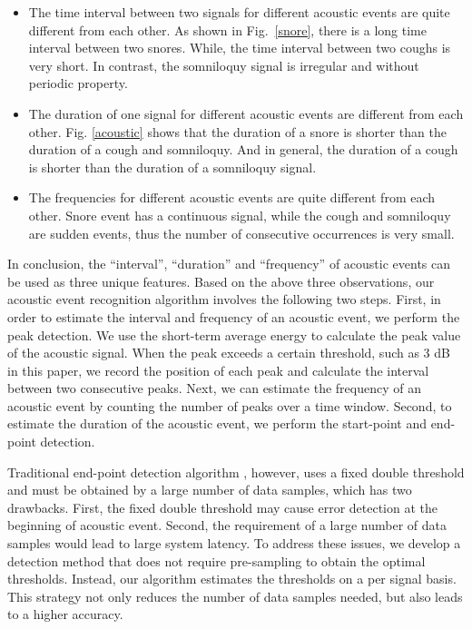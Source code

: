  \begin{itemize}[itemsep=1mm,nolistsep]
\item The time interval between two signals for different acoustic events are quite different from each other. As shown in Fig.~\ref{snore}, there is a long time interval between two snores. While, the time interval between two coughs is very short.  In contrast, the  somniloquy signal is irregular and without periodic property.
 \item The duration of one signal for different acoustic events are different from each other. Fig. \ref{acoustic} shows that the duration of a snore is shorter than the duration of a cough and somniloquy. And in general, the duration of a cough is shorter than the duration of a somniloquy signal.
\item The frequencies for different acoustic events are quite different from each other. Snore event has a continuous signal, while the  cough and somniloquy are sudden events, thus the number of consecutive occurrences is very small.
\end{itemize}
In conclusion, the ``interval'', ``duration'' and ``frequency'' of acoustic events can be used as three unique features. Based on the above three observations, our acoustic event recognition algorithm involves the following two steps. First, in order to estimate the interval and frequency of an acoustic event, we perform the peak detection. We use the short-term average energy to calculate the peak value of the acoustic signal. When the peak exceeds a certain threshold, such as 3 dB in this paper, we record the position of each peak and calculate the interval between two consecutive peaks. Next, we can estimate the frequency of an acoustic event by counting the number of peaks over a time window. Second, to estimate the duration of the acoustic event, we perform the start-point and end-point detection.

Traditional end-point detection algorithm \cite{stowell2015detection}, however, uses a fixed double threshold and must be obtained by a
large number of data samples, which has two drawbacks. First, the fixed double threshold may cause error detection at the beginning of
acoustic event. Second, the requirement of a large number of data samples would lead to large system latency. To address
these issues, we develop a detection method that does not require pre-sampling to obtain the optimal thresholds. Instead, our algorithm
estimates the thresholds on a per signal basis. This strategy not only reduces the number of data samples needed, but also leads to a
higher accuracy. 

